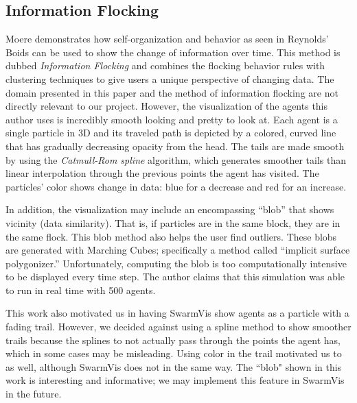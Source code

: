 \documentclass[conference]{IEEEtran}
\begin{document}
\subsection{Information Flocking}
Moere demonstrates how self-organization and behavior as seen in Reynolds' Boids can be used to show the change of information over time\cite{1382896}. This method is dubbed {\em Information Flocking} and combines the flocking behavior rules with clustering techniques to give users a unique perspective of changing data.  The domain presented in this paper and the method of information flocking are not directly relevant to our project. However, the visualization of the agents this author uses is incredibly smooth looking and pretty to look at. Each agent is a single particle in 3D and its traveled path is depicted by a colored, curved line that has gradually decreasing opacity from the head. The tails are made smooth by using the {\em Catmull-Rom spline} algorithm, which generates smoother tails than linear interpolation through the previous points the agent has visited. The particles' color shows change in data: blue for a decrease and red for an increase.

In addition, the visualization may include an encompassing ``blob'' that shows vicinity (data similarity). That is, if particles are in the same block, they are in the same flock. This blob method also helps the user find outliers.  
These blobs are generated with Marching Cubes; specifically a method called ``implicit surface polygonizer.'' Unfortunately, computing the blob is too computationally intensive to be displayed every time step.  
The author claims that this simulation was able to run in real time with 500 agents.

This work also motivated us in having SwarmVis show agents as a particle with a fading trail.
However, we decided against using a spline method to show smoother trails because the splines to not actually
pass through the points the agent has, which in some cases may be misleading.
Using color in the trail motivated us to as well, although SwarmVis does not in the same way.
The ``blob" shown in this work is interesting and informative; we may implement this feature in SwarmVis in the future.
\end{document}
